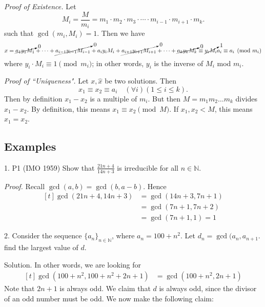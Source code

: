 \documentclass{article}
\begin{document}
    \vspace{1.5mm}
    \textit{Proof of Existence. } Let $$M_{i} = \frac{M}{m_{i}} = m_{1} \cdot m_{2} \cdot m_{3} \cdot \cdots \cdot m_{i - 1} \cdot m_{i + 1} \cdot m_{k}.$$ such that $\gcd(m_{i}, M_{i}) = 1$.
    Then we have $$x = \cancelto{0}{a_{1}y_{1}M_{1}} + \dots + \cancelto{0}{a_{i - 1}y_{i - 1}M_{i - 1}} + a_{i}y_{i}M_{i} + \cancelto{0}{a_{i + 1}y_{i + 1}M_{i + 1}} + \cdots + \cancelto{0}{a_{k}y_{k}M_{k}} \equiv \cancelto{1}{y_{i}M_{i}}a_{i} \equiv a_{i} \pmod{m_{i}}$$ where $y_{i} \cdot M_{i} \equiv 1 \pmod{m_{i}}$; in other words, $y_{i}$ is the inverse of $M_{i}$ mod $m_{i}$.
    
    \vspace{1.5mm}
    \textit{Proof of ``Uniqueness". } Let $x, \hat{x}$ be two solutions. Then $$x_{1} \equiv x_{2} \equiv a_{i} \quad (\forall i)(1 \le i \le k).$$ Then by definition $x_{1} - x_{2}$ is a multiple of $m_{i}$. But then $M = m_{1}m_{2}\dots m_{k}$ divides $x_{1} - x_{2}$. By definition, this means $x_{1} \equiv x_{2} \pmod{M}$. If $x_{1}, x_{2} < M$, this means $x_{1} = x_{2}$.

\subsection*{Examples}
    1. P1 (IMO 1959) Show that $\frac{21n + 4}{14n + 3}$ is irreducible for all $n \in \mathbb{N}$.
    
    \vspace{1.5mm}
    \textit{Proof. } Recall $\gcd(a, b) = \gcd(b, a - b)$. Hence 
    $$\begin{aligned}[t]
        \gcd(21n + 4, 14n + 3) &= \gcd(14n + 3, 7n + 1)\\
        &= \gcd(7n + 1, 7n + 2) \\
        &= \gcd(7n + 1, 1) = 1
    \end{aligned}$$
    
    
    2. Consider the sequence $\{a_{n}\}_{n \in \mathbb{N}}$, where $a_{n} = 100 + n^{2}$. Let $d_{n} = \gcd(a_{n}, a_{n + 1}$. find the largest value of $d$.
    
    \vspace{1.5mm} Solution. In other words, we are looking for
    $$\begin{aligned}[t]
        \gcd(100 + n^{2}, 100 + n^{2} + 2n + 1) &= \gcd(100 + n^{2}, 2n + 1)
    \end{aligned}$$
    Note that $2n + 1$ is always odd. We claim that $d$ is always odd, since the divisor of an odd number must be odd. We now make the following claim:
    
\end{document}
